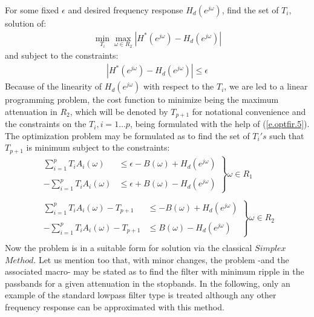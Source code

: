 {For some fixed $\epsilon$ and desired frequency response $H_{d}(e^{j\omega})$, 
find the set of ${T_i}$, solution of: 
\begin{eqnarray}
\min_{T_i}\max_{\omega \in R_2}|H^{*}(e^{j\omega}) - H_{d}(e^{j\omega})|
\label{e.optfir.4}
\end{eqnarray}
and subject to the constraints: 
\begin{eqnarray}
|H^{*}(e^{j\omega}) - H_{d}(e^{j\omega})| \leq \epsilon
\label{e.optfir.5}
\end{eqnarray}
Because of the linearity of $H_{d}(e^{j\omega})$ with respect to the $T_i$, 
we are led to a linear programming problem, the cost function to minimize 
being the maximum attenuation in $R_2$, which will be denoted by $T_{p+1}$ 
for notational convenience and the constraints on the $T_i , i=1 \ldots p$, 
being formulated with the help of (\ref{e.optfir.5}). The optimization 
problem may be formulated as to find the set of $T_i's$ such that 
$T_{p+1}$ is minimum subject to the constraints:
\[
\begin{array}{c}
\left.
\begin{array}{cc}
\sum_{i=1}^pT_iA_i(\omega) & \leq  \epsilon-B(\omega)+H_{d}(e^{j\omega})\\ \\
-\sum_{i=1}^pT_iA_i(\omega) & \leq  \epsilon+B(\omega)-H_{d}(e^{j\omega})
\end{array}
\right \} \omega \in R_1\\ \\
\left .
\begin{array}{cc} 
\sum_{i=1}^pT_iA_i(\omega)-T_{p+1} & \leq  -B(\omega)+H_{d}(e^{j\omega})\\ \\
-\sum_{i=1}^pT_iA_i(\omega)-T_{p+1} & \leq  B(\omega)-H_{d}(e^{j\omega})
\end{array}
\right \} \omega \in R_2\\
\end{array}
\]
Now the problem is in a suitable form for solution via the classical 
$Simplex$ $Method$. Let us mention too that, with minor changes, the 
problem -and the associated macro- may be stated as to find the filter 
with minimum ripple in 
the passbands for a given attenuation in the stopbands.
In the following, only an example of the standard lowpass filter type
is treated although any other frequency 
response can be approximated with this method. 

}
